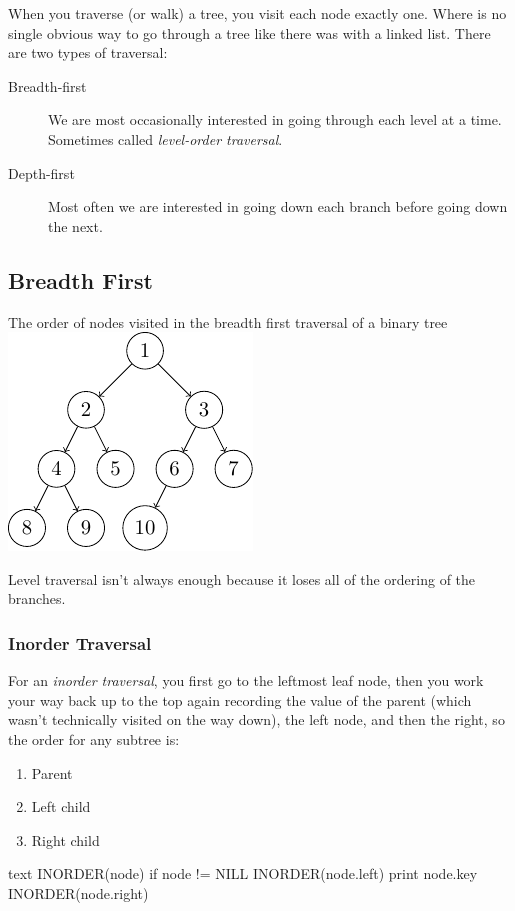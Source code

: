 When you traverse (or walk) a tree, you visit each node exactly one.
Where is no single obvious way to go through a tree like there was with a linked list.
There are two types of traversal:
\begin{description}
    \item[Breadth-first] We are most occasionally interested in going through each level at a time. Sometimes called \emph{level-order traversal}.
    \item[Depth-first] Most often we are interested in going down each branch before going down the next.
\end{description}

\subsection{Breadth First}\label{sub:breadth_first}

\begin{highlight}{The order of nodes visited in the breadth first traversal of a binary tree}
    \includegraphics{lualatex/pa/8/breadthfirst.pdf}
\end{highlight}

Level traversal isn't always enough because it loses all of the ordering of the branches.

\subsubsection{Inorder Traversal}\label{ssub:inorder_traversal}

For an \emph{inorder traversal}, you first go to the leftmost leaf node, then you work your way back up to the top again recording the value of the parent (which wasn't technically visited on the way down), the left node, and then the right, so the order for any subtree is:
\begin{enumerate}
    \item Parent
    \item Left child
    \item Right child
\end{enumerate}
\begin{code}{text}
    INORDER(node)
        if node != NILL
            INORDER(node.left)
            print node.key
            INORDER(node.right)
\end{code}

